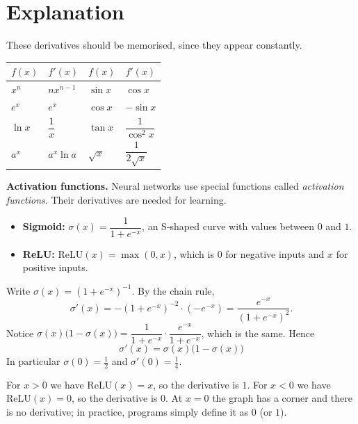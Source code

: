 \label{ch:keyfunctions}

\section*{Explanation}
These derivatives should be memorised, since they appear constantly.

\begin{center}
\renewcommand{\arraystretch}{1.7}
\begin{tabular}{ll|ll}
$f(x)$ & $f'(x)$ & $f(x)$ & $f'(x)$\\\hline
$x^n$ & $n x^{n-1}$ & $\sin x$ & $\cos x$\\
$e^x$ & $e^x$ & $\cos x$ & $-\sin x$\\
$\ln x$ & $\dfrac1x$ & $\tan x$ & $\dfrac{1}{\cos^2 x}$\\
$a^x$ & $a^x\ln a$ & $\sqrt{x}$ & $\dfrac{1}{2\sqrt x}$
\end{tabular}
\end{center}

\textbf{Activation functions.} Neural networks use special functions called \emph{activation functions}. Their derivatives are needed for learning.

\begin{itemize}
  \item \textbf{Sigmoid:} $\sigma(x)=\dfrac{1}{1+e^{-x}}$, an S-shaped curve with values between $0$ and $1$.
  \item \textbf{ReLU:} $\mathrm{ReLU}(x)=\max(0,x)$, which is $0$ for negative inputs and $x$ for positive inputs.
\end{itemize}

\begin{example}
Write $\sigma(x)=(1+e^{-x})^{-1}$. By the chain rule,
\[
\sigma'(x)=-(1+e^{-x})^{-2}\cdot(-e^{-x})=\frac{e^{-x}}{(1+e^{-x})^2}.
\]
Notice $\sigma(x)\bigl(1-\sigma(x)\bigr)=\dfrac{1}{1+e^{-x}}\cdot\dfrac{e^{-x}}{1+e^{-x}}$, which is the same. Hence
\[
\boxed{\sigma'(x)=\sigma(x)\bigl(1-\sigma(x)\bigr)}
\]
In particular $\sigma(0)=\tfrac12$ and $\sigma'(0)=\tfrac14$.
\end{example}

\begin{example}
For $x>0$ we have $\mathrm{ReLU}(x)=x$, so the derivative is $1$. For $x<0$ we have $\mathrm{ReLU}(x)=0$, so the derivative is $0$. At $x=0$ the graph has a corner and there is no derivative; in practice, programs simply define it as $0$ (or $1$).
\end{example}

